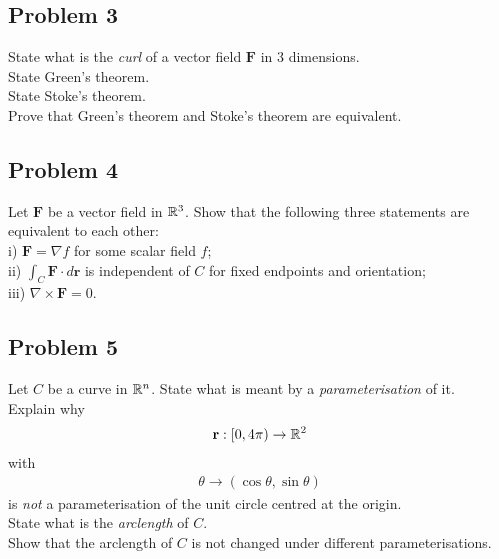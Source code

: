 \documentclass[a4paper]{article}
\begin{document}
\subsection{Problem 3}
State what is the \emph{curl} of a vector field $\mathbf{F}$ in 3 dimensions.\\
State Green's theorem.\\
State Stoke's theorem.\\
Prove that Green's theorem and Stoke's theorem are equivalent.

\subsection{Problem 4}
Let $\mathbf{F}$ be a vector field in $\mathbb{R}^3$. Show that the following three statements are equivalent to each other:\\
i) $\mathbf{F}=\nabla f$ for some scalar field $f$;\\
ii) $\int_C \mathbf{F}\cdot d\mathbf{r}$ is independent of $C$ for fixed endpoints and orientation;\\
iii) $\nabla\times\mathbf{F}=0$.

\subsection{Problem 5}
Let $C$ be a curve in $\mathbb{R}^n$. State what is meant by a \emph{parameterisation} of it.\\
Explain why
\begin{equation*}
\begin{aligned}
\mathbf{r}:[0,4\pi) \to \mathbb{R}^2
\end{aligned}
\end{equation*}
with
\begin{equation*}
\begin{aligned}
\theta \to \left(\cos\theta,\sin\theta\right)
\end{aligned}
\end{equation*}
is \emph{not} a parameterisation of the unit circle centred at the origin.\\
State what is the \emph{arclength} of $C$.\\
Show that the arclength of $C$ is not changed under different parameterisations.
\end{document}
